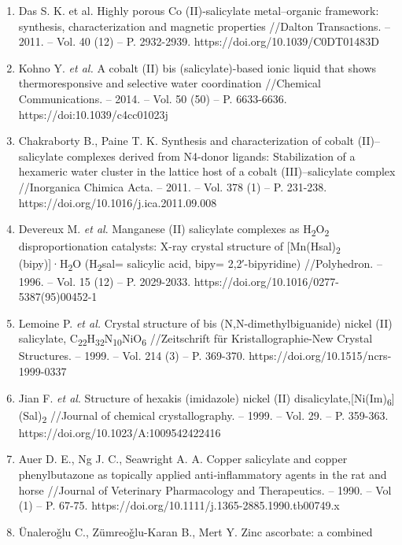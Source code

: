 \begin{enumerate}
\def\labelenumi{\arabic{enumi}.}
\item
  Das S. K. et al. Highly porous Co (II)-salicylate metal--organic
  framework: synthesis, characterization and magnetic properties
  //Dalton Transactions. -- 2011. -- Vol. 40 (12) -- P. 2932-2939.
  https://doi.org/10.1039/C0DT01483D
\item
  Kohno Y. \emph{et al.} A cobalt (II) bis (salicylate)-based ionic
  liquid that shows thermoresponsive and selective water coordination
  //Chemical Communications. -- 2014. -- Vol. 50 (50) -- P. 6633-6636.
  https://doi:10.1039/c4cc01023j
\item
  Chakraborty B., Paine T. K. Synthesis and characterization of cobalt
  (II)--salicylate complexes derived from N4-donor ligands:
  Stabilization of a hexameric water cluster in the lattice host of a
  cobalt (III)--salicylate complex //Inorganica Chimica Acta. -- 2011.
  -- Vol. 378 (1) -- P. 231-238.
  https://doi.org/10.1016/j.ica.2011.09.008
\item
  Devereux M. \emph{et al}. Manganese (II) salicylate complexes as
  H\textsubscript{2}O\textsubscript{2} disproportionation catalysts:
  X-ray crystal structure of {[}Mn(Hsal)\textsubscript{2}
  (bipy){]}·H\textsubscript{2}O (H\textsubscript{2}sal= salicylic acid,
  bipy= 2,2′-bipyridine) //Polyhedron. -- 1996. -- Vol. 15 (12) -- P.
  2029-2033. https://doi.org/10.1016/0277-5387(95)00452-1
\item
  Lemoine P. \emph{et al.} Crystal structure of bis
  (N,N-dimethylbiguanide) nickel (II) salicylate,
  C\textsubscript{22}H\textsubscript{32}N\textsubscript{10}NiO\textsubscript{6}
  //Zeitschrift für Kristallographie-New Crystal Structures. -- 1999. --
  Vol. 214 (3) -- P. 369-370. https://doi.org/10.1515/ncrs-1999-0337
\item
  Jian F. \emph{et al}. Structure of hexakis (imidazole) nickel (II)
  disalicylate,{[}Ni(Im)\textsubscript{6}{]}(Sal)\textsubscript{2}
  //Journal of chemical crystallography. -- 1999. -- Vol. 29. -- P.
  359-363. https://doi.org/10.1023/A:1009542422416
\item
  Auer D. E., Ng J. C., Seawright A. A. Copper salicylate and copper
  phenylbutazone as topically applied anti‐inflammatory agents in the
  rat and horse //Journal of Veterinary Pharmacology and Therapeutics.
  -- 1990. -- Vol (1) -- P. 67-75.
  https://doi.org/10.1111/j.1365-2885.1990.tb00749.x
\item
  Ünaleroǧlu C., Zümreoǧlu-Karan B., Mert Y. Zinc ascorbate: a combined

\end{enumerate}
